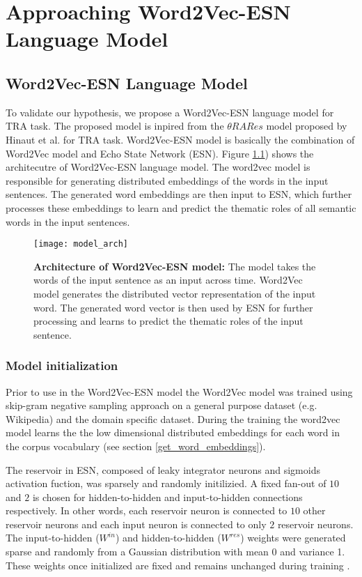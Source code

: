 \chapter{Approaching Word2Vec-ESN Language Model}\label{approach}

\section{Word2Vec-ESN Language Model}

To validate our hypothesis, we propose a Word2Vec-ESN language model for TRA task. The proposed model is inpired from the $\theta RARes$ model proposed by Hinaut et al. \cite{xavier:2013:RT} for TRA task. Word2Vec-ESN model is basically the combination of Word2Vec model and Echo State Network (ESN). Figure \ref{fig:model_arch}) shows the architecutre of Word2Vec-ESN language model. The word2vec model is responsible for generating distributed embeddings of the words in the input sentences. The generated word embeddings are then input to ESN, which further processes these embeddings to learn and predict the thematic roles of all semantic words in the input sentences. 

\begin{figure}[hbtp]
\centering
\texttt{[image: model\_arch]}
\caption[Architecture of Word2Vec-ESN model]{\textbf{Architecture of Word2Vec-ESN model:} The model takes the words of the input sentence as an input across time. Word2Vec model generates the distributed vector representation of the input word. The generated word vector is then used by ESN for further processing and learns to predict the thematic roles of the input sentence.}
\label{fig:model_arch}
\end{figure}

\subsection{Model initialization}

Prior to use in the Word2Vec-ESN model the Word2Vec model was trained using skip-gram negative sampling \cite{w2v:mikolov_2013_distributed} approach on a general purpose dataset (e.g. Wikipedia) and the domain specific dataset. During the training the word2vec model learns the the low dimensional distributed embeddings for each word in the corpus vocabulary (see section \ref{get_word_embeddings}).

The reservoir in ESN, composed of leaky integrator neurons and sigmoids activation fuction, was sparsely and randomly initilizied. A fixed fan-out of $10$ and $2$ is chosen for hidden-to-hidden and input-to-hidden connections respectively. In other words, each reservoir neuron is connected to $10$ other reservoir neurons and each input neuron is connected to only $2$ reservoir neurons. The input-to-hidden ($W^{in}$) and hidden-to-hidden ($W^{res}$) weights were generated sparse and randomly from a Gaussian distribution with mean 0 and variance 1. These weights once initialized are fixed and remains unchanged during training \cite{esn:scholarpedia:2007, esn:practical_guide}. 

